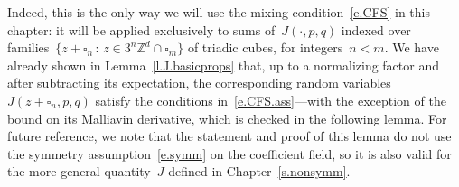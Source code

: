 \documentclass[11pt,twoside]{article} %
\let\oldsquare\square %
\renewcommand{\square}{\oldsquare}
\numberwithin{equation}{section}
\theoremstyle{definition}
\newcommand*{\Zd}{\ensuremath{\mathbb{Z}^d}}
\newcommand{\cu}{\square}
\begin{document}
\smallskip

Indeed, this is the only way we will use the mixing condition~\eqref{e.CFS} in this chapter: it will be applied exclusively to sums of~$J(\cdot,p,q)$ indexed over families~$\{ z+\cu_n\,:\, z\in 3^n\Zd\cap \cu_m \}$ of triadic cubes, for integers~$n<m$. We have already shown in Lemma~\ref{l.J.basicprops} that, up to a normalizing factor and after subtracting its expectation, the corresponding random variables~$J(z+\cu_n,p,q)$ satisfy the conditions in~\eqref{e.CFS.ass}---with the exception of the bound on its Malliavin derivative, which is checked in the following lemma. For future reference, we note that the statement and proof of this lemma do not use the symmetry assumption~\eqref{e.symm} on the coefficient field, so it is also valid for the more general quantity~$J$ defined in Chapter~\ref{s.nonsymm}. 
\end{document}
